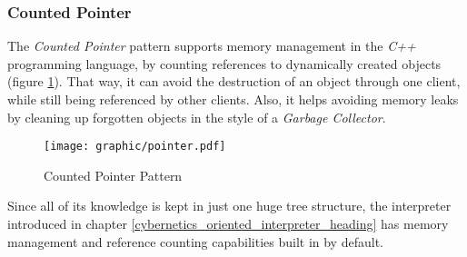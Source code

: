 %
%
%
%
%
%
%

\subsubsection{Counted Pointer}
\label{counted_pointer_heading}

The \emph{Counted Pointer} pattern \cite{buschmann} supports memory management
in the \emph{C++} programming language, by counting references to dynamically
created objects (figure \ref{pointer_figure}). That way, it can avoid the
destruction of an object through one client, while still being referenced by
other clients. Also, it helps avoiding memory leaks by cleaning up forgotten
objects in the style of a \emph{Garbage Collector}.

\begin{figure}[ht]
    \begin{center}
        \texttt{[image: graphic/pointer.pdf]}
        \caption{Counted Pointer Pattern}
        \label{pointer_figure}
    \end{center}
\end{figure}

Since all of its knowledge is kept in just one huge tree structure, the
interpreter introduced in chapter \ref{cybernetics_oriented_interpreter_heading}
has memory management and reference counting capabilities built in by default.
